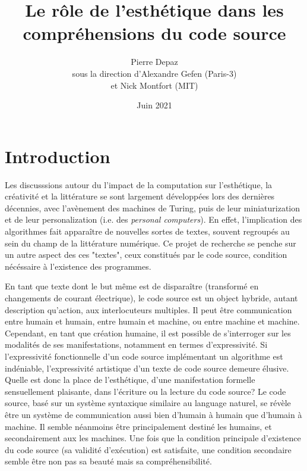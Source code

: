 \documentclass{article}
\begin{document}
\title{Le rôle de l'esthétique dans les compréhensions du code source}
\author{Pierre Depaz\\sous la direction d'Alexandre Gefen (Paris-3)\\et Nick Montfort (MIT)}
\date{Juin 2021}
\maketitle

\section{Introduction}

Les discusssions autour du l'impact de la computation sur l'esthétique, la créativité et la littérature se sont largement développées lors des dernières décennies, avec l'avènement des machines de Turing, puis de leur miniaturization et de leur personalization (i.e. des \emph{personal computers}). En effet, l'implication des algorithmes fait apparaître de nouvelles sortes de textes, souvent regroupés au sein du champ de la littérature numérique. Ce projet de recherche se penche sur un autre aspect des ces "textes", ceux constitués par le code source, condition nécéssaire à l'existence des programmes.

En tant que texte dont le but même est de disparaître (transformé en changements de courant électrique), le code source est un object hybride, autant description qu'action, aux interlocuteurs multiples. Il peut être communication entre humain et humain, entre humain et machine, ou entre machine et machine. Cependant, en tant que création humaine, il est possible de s'interroger sur les modalités de ses manifestations, notamment en termes d'expressivité. Si l'expressivité fonctionnelle d'un code source implémentant un algorithme est indéniable, l'expressivité artistique d'un texte de code source demeure élusive. Quelle est donc la place de l'esthétique, d'une manifestation formelle sensuellement plaisante, dans l'écriture ou la lecture du code source? Le code source, basé sur un système syntaxique similaire au language naturel, se révèle être un système de communication aussi bien d'humain à humain que d'humain à machine. Il semble néanmoins être principalement destiné les humains, et secondairement aux les machines\cite{abelson_structure_1979}. Une fois que la condition principale d'existence du code source (sa validité d'exécution) est satisfaite, une condition secondaire semble être non pas sa beauté mais sa compréhensibilité.
\end{document}
